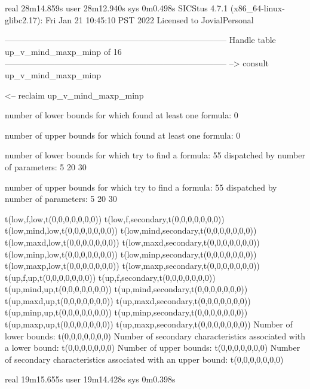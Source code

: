 real	28m14.859s
user	28m12.940s
sys	0m0.498s
SICStus 4.7.1 (x86_64-linux-glibc2.17): Fri Jan 21 10:45:10 PST 2022
Licensed to JovialPersonal


--------------------------------------------------------------------------------
Handle table up_v_mind_maxp_minp of 16
--------------------------------------------------------------------------------
--> consult up_v_mind_maxp_minp

<-- reclaim up_v_mind_maxp_minp

number of lower bounds for which found at least one formula: 0

number of upper bounds for which found at least one formula: 0

number of lower bounds for which try to find a formula: 55
dispatched by number of parameters: 5  20  30

number of upper bounds for which try to find a formula: 55
dispatched by number of parameters: 5  20  30

t(low,f,low,t(0,0,0,0,0,0,0))
t(low,f,secondary,t(0,0,0,0,0,0,0))
t(low,mind,low,t(0,0,0,0,0,0,0))
t(low,mind,secondary,t(0,0,0,0,0,0,0))
t(low,maxd,low,t(0,0,0,0,0,0,0))
t(low,maxd,secondary,t(0,0,0,0,0,0,0))
t(low,minp,low,t(0,0,0,0,0,0,0))
t(low,minp,secondary,t(0,0,0,0,0,0,0))
t(low,maxp,low,t(0,0,0,0,0,0,0))
t(low,maxp,secondary,t(0,0,0,0,0,0,0))
t(up,f,up,t(0,0,0,0,0,0,0))
t(up,f,secondary,t(0,0,0,0,0,0,0))
t(up,mind,up,t(0,0,0,0,0,0,0))
t(up,mind,secondary,t(0,0,0,0,0,0,0))
t(up,maxd,up,t(0,0,0,0,0,0,0))
t(up,maxd,secondary,t(0,0,0,0,0,0,0))
t(up,minp,up,t(0,0,0,0,0,0,0))
t(up,minp,secondary,t(0,0,0,0,0,0,0))
t(up,maxp,up,t(0,0,0,0,0,0,0))
t(up,maxp,secondary,t(0,0,0,0,0,0,0))
Number of lower bounds:                                             t(0,0,0,0,0,0,0)
Number of secondary characteristics associated with a lower bound:  t(0,0,0,0,0,0,0)
Number of upper bounds:                                             t(0,0,0,0,0,0,0)
Number of secondary characteristics associated with an upper bound: t(0,0,0,0,0,0,0)

real	19m15.655s
user	19m14.428s
sys	0m0.398s
